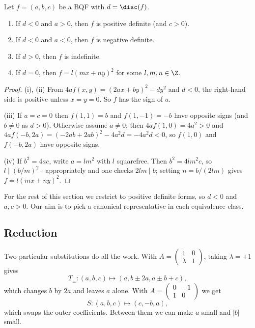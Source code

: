 \begin{lemma}\label{lem:definite}
	Let $f = (a,b,c)$ be a BQF with $d = \disc(f)$.
	\begin{enumerate}[label=(\roman*)]
		\item If $d < 0$ and $a > 0$, then $f$ is positive definite (and $c > 0$).
		\item If $d < 0$ and $a < 0$, then $f$ is negative definite.
		\item If $d > 0$, then $f$ is indefinite.
		\item If $d = 0$, then $f = l(mx + ny)^2$ for some $l, m, n \in \Z$.
	\end{enumerate}
\end{lemma}
\begin{proof}
	(i), (ii) From $4af(x,y) = (2ax + by)^2 - dy^2$ and $d < 0$, the right-hand side is positive unless $x = y = 0$. So $f$ has the sign of $a$.

	(iii) If $a = c = 0$ then $f(1,1) = b$ and $f(1,-1) = -b$ have opposite signs (and $b \neq 0$ as $d > 0$). Otherwise assume $a \neq 0$; then $4af(1,0) = 4a^2 > 0$ and $4af(-b, 2a) = (-2ab + 2ab)^2 - 4a^2 d = -4a^2d < 0$, so $f(1,0)$ and $f(-b, 2a)$ have opposite signs.

	(iv) If $b^2 = 4ac$, write $a = l m^2$ with $l$ squarefree. Then $b^2 = 4lm^2c$, so $l \mid (b/m)^2 \cdot$ appropriately and one checks $2lm \mid b$; setting $n = b/(2lm)$ gives $f = l(mx + ny)^2$.
\end{proof}

For the rest of this section we restrict to positive definite forms, so $d < 0$ and $a, c > 0$. Our aim is to pick a canonical representative in each equivalence class.

\subsection{Reduction}

Two particular substitutions do all the work. With $A = \left(\begin{smallmatrix} 1 & 0 \\ \lambda & 1\end{smallmatrix}\right)$, taking $\lambda = \pm1$ gives
$$
T_\pm : (a, b, c) \longmapsto (a, b \pm 2a, a \pm b + c),
$$
which changes $b$ by $2a$ and leaves $a$ alone. With $A = \left(\begin{smallmatrix} 0 & -1 \\ 1 & 0\end{smallmatrix}\right)$ we get
$$
S : (a, b, c) \longmapsto (c, -b, a),
$$
which swaps the outer coefficients. Between them we can make $a$ small and $|b|$ small.


